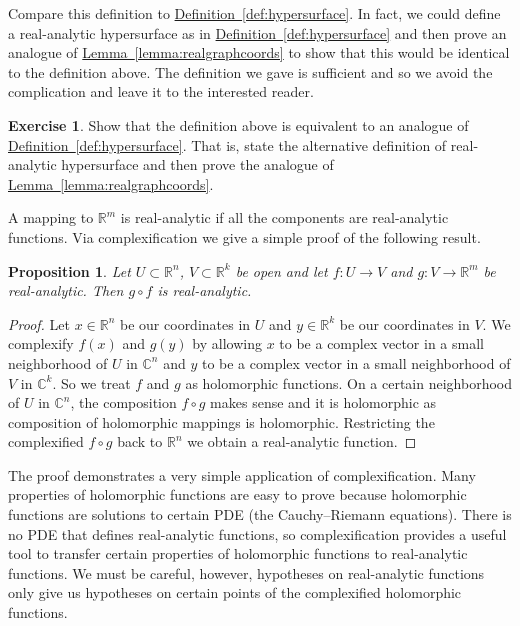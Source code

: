 \documentclass[12pt,openany]{book}
\newcommand{\C}{{\mathbb{C}}}
\newcommand{\R}{{\mathbb{R}}}
\theoremstyle{plain}
\newtheorem{prop}[thm]{Proposition}
\theoremstyle{remark}
\theoremstyle{definition}
\newenvironment{exbox}{%
    \def\FrameCommand{\vrule width 1pt \relax\hspace {10pt}}%
    \MakeFramed {\advance \hsize -\width \FrameRestore }%
}{%
    \endMakeFramed
}
\theoremstyle{exercise}
\newtheorem{exercise}{Exercise}[section]
\theoremstyle{example}
\newcommand{\lemmaref}[1]{\hyperref[#1]{Lemma~\ref*{#1}}}
\newcommand{\defnref}[1]{\hyperref[#1]{Definition~\ref*{#1}}}
\begin{document}
Compare this definition to \defnref{def:hypersurface}.  In fact, we could
define a real-analytic hypersurface as in 
\defnref{def:hypersurface} and then prove an analogue of
\lemmaref{lemma:realgraphcoords} to show that this would be identical to the
definition above.  The definition we gave is sufficient and so we avoid
the complication and leave it to the interested reader.

\begin{exbox}
\begin{exercise}
Show that the definition above is equivalent to an analogue of
\defnref{def:hypersurface}.  That is, state the alternative definition of
real-analytic hypersurface and then prove the analogue of 
\lemmaref{lemma:realgraphcoords}.
\end{exercise}
\end{exbox}

A mapping to $\R^m$ is real-analytic if all the components are real-analytic
functions.  Via complexification we give a simple proof of the following
result.

\begin{prop}
Let $U \subset \R^n$, $V \subset \R^k$ be open and let
$f \colon U \to V$ and $g \colon V \to \R^m$ be real-analytic.
Then $g \circ f$ is real-analytic.
\end{prop}

\begin{proof}
Let $x \in \R^n$ be our coordinates in $U$ and $y \in \R^k$ be
our coordinates in $V$.  We complexify $f(x)$ and $g(y)$ by
allowing $x$ to be a complex vector in a small neighborhood of $U$ in
$\C^n$
and  $y$ to be a complex vector in a small neighborhood of $V$ in $\C^k$.
So we treat $f$ and $g$ as holomorphic functions.  On a certain
neighborhood of $U$ in $\C^n$, the composition $f \circ g$ makes sense
and it is holomorphic as composition of holomorphic mappings is holomorphic.
Restricting the complexified $f \circ g$ back to $\R^n$ we obtain a
real-analytic function.
\end{proof}

The proof demonstrates a very simple application of complexification.  Many
properties of holomorphic functions are easy to prove because
holomorphic functions are solutions to certain PDE (the Cauchy--Riemann
equations).  There is no PDE
that defines real-analytic functions, so complexification provides a useful
tool to transfer certain properties of holomorphic functions to
real-analytic functions.  We must be careful, however, hypotheses on
real-analytic functions only give us hypotheses on certain points of the
complexified holomorphic functions.
\end{document}
